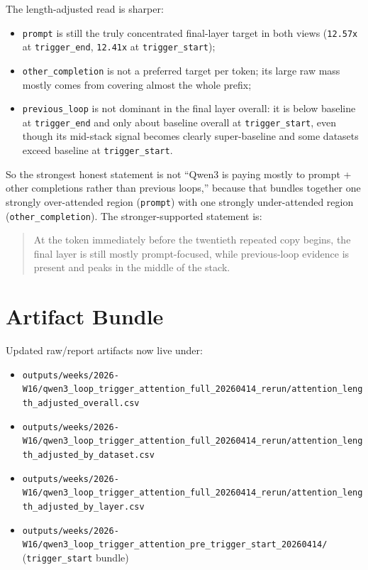 \documentclass[11pt]{article}
\begin{document}
The length-adjusted read is sharper:

\begin{itemize}
  \item \texttt{prompt} is still the truly concentrated final-layer target in both views (\texttt{12.57x} at \texttt{trigger\_end}, \texttt{12.41x} at \texttt{trigger\_start});
  \item \texttt{other\_completion} is not a preferred target per token; its large raw mass mostly comes from covering almost the whole prefix;
  \item \texttt{previous\_loop} is not dominant in the final layer overall: it is below baseline at \texttt{trigger\_end} and only about baseline overall at \texttt{trigger\_start}, even though its mid-stack signal becomes clearly super-baseline and some datasets exceed baseline at \texttt{trigger\_start}.
\end{itemize}

So the strongest honest statement is not ``Qwen3 is paying mostly to prompt + other completions rather than previous loops,'' because that bundles together one strongly over-attended region (\texttt{prompt}) with one strongly under-attended region (\texttt{other\_completion}). The stronger-supported statement is:

\begin{quote}
At the token immediately before the twentieth repeated copy begins, the final layer is still mostly prompt-focused, while previous-loop evidence is present and peaks in the middle of the stack.
\end{quote}

\section*{Artifact Bundle}

Updated raw/report artifacts now live under:

\begin{itemize}
  \item \texttt{outputs/weeks/2026-W16/qwen3\_loop\_trigger\_attention\_full\_20260414\_rerun/attention\_length\_adjusted\_overall.csv}
  \item \texttt{outputs/weeks/2026-W16/qwen3\_loop\_trigger\_attention\_full\_20260414\_rerun/attention\_length\_adjusted\_by\_dataset.csv}
  \item \texttt{outputs/weeks/2026-W16/qwen3\_loop\_trigger\_attention\_full\_20260414\_rerun/attention\_length\_adjusted\_by\_layer.csv}
  \item \texttt{outputs/weeks/2026-W16/qwen3\_loop\_trigger\_attention\_pre\_trigger\_start\_20260414/} (\texttt{trigger\_start} bundle)
\end{itemize}
\end{document}

